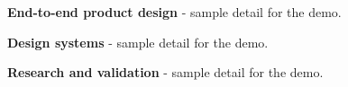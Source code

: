 \documentclass[11pt,a4paper]{article}
\begin{document}
\begin{resumeitems}
    \item \textbf{End-to-end product design} - sample detail for the demo.
    \item \textbf{Design systems} - sample detail for the demo.
    \item \textbf{Research and validation} - sample detail for the demo.
\end{resumeitems}
\end{document}
